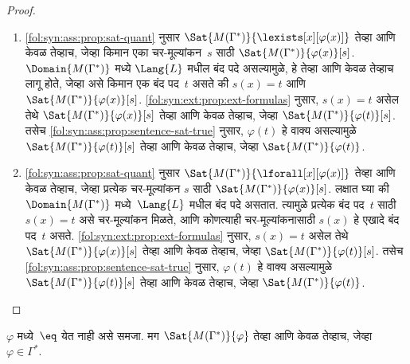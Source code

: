 \begin{proof}
\begin{enumerate}
\item
  \ref{fol:syn:ass:prop:sat-quant} नुसार
    $\Sat{M(\Gamma^*)}{\lexists[x][\varphi(x)]}$ तेव्हा आणि केवळ तेव्हाच,
    जेव्हा किमान एका चर-मूल्यांकन~$s$ साठी
    $\Sat{M(\Gamma^*)}{\varphi(x)}[s]$. $\Domain{M(\Gamma^*)}$ मध्ये
    $\Lang{L}$ मधील बंद पदे असल्यामुळे, हे तेव्हा आणि केवळ तेव्हाच लागू
    होते, जेव्हा असे किमान एक बंद पद~$t$ असते की $s(x) = t$ आणि
    $\Sat{M(\Gamma^*)}{\varphi(x)}[s]$. \ref{fol:syn:ext:prop:ext-formulas}
    नुसार, $s(x) = t$ असेल तेथे $\Sat{M(\Gamma^*)}{\varphi(x)}[s]$ तेव्हा आणि
    केवळ तेव्हाच, जेव्हा $\Sat{M(\Gamma^*)}{\varphi(t)}[s]$. तसेच
    \ref{fol:syn:ass:prop:sentence-sat-true} नुसार,
    $\varphi(t)$ हे वाक्य असल्यामुळे $\Sat{M(\Gamma^*)}{\varphi(t)}[s]$ तेव्हा आणि
    केवळ तेव्हाच, जेव्हा $\Sat{M(\Gamma^*)}{\varphi(t)}$.
\item
  \ref{fol:syn:ass:prop:sat-quant} नुसार
    $\Sat{M(\Gamma^*)}{\lforall[x][\varphi(x)]}$ तेव्हा आणि केवळ तेव्हाच,
    जेव्हा प्रत्येक चर-मूल्यांकन $s$ साठी
    $\Sat{M(\Gamma^*)}{\varphi(x)}[s]$. लक्षात घ्या की
    $\Domain{M(\Gamma^*)}$ मध्ये~$\Lang{L}$ मधील बंद पदे असतात. त्यामुळे
    प्रत्येक बंद पद~$t$ साठी $s(x) = t$ असे चर-मूल्यांकन मिळते, आणि
    कोणत्याही चर-मूल्यांकनासाठी $s(x)$ हे एखादे बंद पद~$t$ असते.
    \ref{fol:syn:ext:prop:ext-formulas} नुसार, $s(x) = t$ असेल तेथे
    $\Sat{M(\Gamma^*)}{\varphi(x)}[s]$ तेव्हा आणि केवळ तेव्हाच, जेव्हा
    $\Sat{M(\Gamma^*)}{\varphi(t)}[s]$. तसेच
    \ref{fol:syn:ass:prop:sentence-sat-true} नुसार,
    $\varphi(t)$ हे वाक्य असल्यामुळे $\Sat{M(\Gamma^*)}{\varphi(t)}[s]$ तेव्हा आणि
    केवळ तेव्हाच, जेव्हा $\Sat{M(\Gamma^*)}{\varphi(t)}$.
\end{enumerate}
\end{proof}




\begin{lem}[सत्यता पूर्वप्रमेय]
\label{fol:com:mod:lem:truth} $\varphi$ मध्ये~$\eq$ येत नाही असे समजा. मग
$\Sat{M(\Gamma^*)}{\varphi}$ तेव्हा आणि केवळ तेव्हाच, जेव्हा $\varphi \in \Gamma^*$.
\end{lem}

